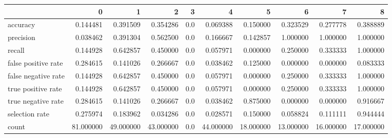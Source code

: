 \begin{tabular}{lrrrrrrrrr}
\toprule
{} &          0 &          1 &          2 &    3 &          4 &          5 &          6 &          7 &          8 \\
\midrule
accuracy            &   0.144481 &   0.391509 &   0.354286 &  0.0 &   0.069388 &   0.150000 &   0.323529 &   0.277778 &   0.388889 \\
precision           &   0.038462 &   0.391304 &   0.562500 &  0.0 &   0.166667 &   0.142857 &   1.000000 &   1.000000 &   1.000000 \\
recall              &   0.144928 &   0.642857 &   0.450000 &  0.0 &   0.057971 &   0.000000 &   0.250000 &   0.333333 &   1.000000 \\
false positive rate &   0.284615 &   0.141026 &   0.266667 &  0.0 &   0.038462 &   0.125000 &   0.000000 &   0.000000 &   0.083333 \\
false negative rate &   0.144928 &   0.642857 &   0.450000 &  0.0 &   0.057971 &   0.000000 &   0.250000 &   0.333333 &   1.000000 \\
true positive rate  &   0.144928 &   0.642857 &   0.450000 &  0.0 &   0.057971 &   0.000000 &   0.250000 &   0.333333 &   1.000000 \\
true negative rate  &   0.284615 &   0.141026 &   0.266667 &  0.0 &   0.038462 &   0.875000 &   0.000000 &   0.000000 &   0.916667 \\
selection rate      &   0.275974 &   0.183962 &   0.034286 &  0.0 &   0.028571 &   0.150000 &   0.058824 &   0.111111 &   0.944444 \\
count               &  81.000000 &  49.000000 &  43.000000 &  0.0 &  44.000000 &  18.000000 &  13.000000 &  16.000000 &  17.000000 \\
\bottomrule
\end{tabular}
